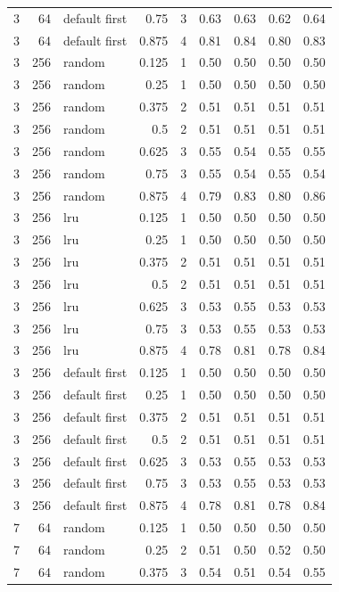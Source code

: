 \begin{longtable}{@{}rrlrrrrrr@{}}
3 & 64 & default first & 0.75 & 3 & 0.63 & 0.63 & 0.62 & 0.64 \\
3 & 64 & default first & 0.875 & 4 & 0.81 & 0.84 & 0.80 & 0.83 \\
3 & 256 & random & 0.125 & 1 & 0.50 & 0.50 & 0.50 & 0.50 \\
3 & 256 & random & 0.25 & 1 & 0.50 & 0.50 & 0.50 & 0.50 \\
3 & 256 & random & 0.375 & 2 & 0.51 & 0.51 & 0.51 & 0.51 \\
3 & 256 & random & 0.5 & 2 & 0.51 & 0.51 & 0.51 & 0.51 \\
3 & 256 & random & 0.625 & 3 & 0.55 & 0.54 & 0.55 & 0.55 \\
3 & 256 & random & 0.75 & 3 & 0.55 & 0.54 & 0.55 & 0.54 \\
3 & 256 & random & 0.875 & 4 & 0.79 & 0.83 & 0.80 & 0.86 \\
3 & 256 & lru & 0.125 & 1 & 0.50 & 0.50 & 0.50 & 0.50 \\
3 & 256 & lru & 0.25 & 1 & 0.50 & 0.50 & 0.50 & 0.50 \\
3 & 256 & lru & 0.375 & 2 & 0.51 & 0.51 & 0.51 & 0.51 \\
3 & 256 & lru & 0.5 & 2 & 0.51 & 0.51 & 0.51 & 0.51 \\
3 & 256 & lru & 0.625 & 3 & 0.53 & 0.55 & 0.53 & 0.53 \\
3 & 256 & lru & 0.75 & 3 & 0.53 & 0.55 & 0.53 & 0.53 \\
3 & 256 & lru & 0.875 & 4 & 0.78 & 0.81 & 0.78 & 0.84 \\
3 & 256 & default first & 0.125 & 1 & 0.50 & 0.50 & 0.50 & 0.50 \\
3 & 256 & default first & 0.25 & 1 & 0.50 & 0.50 & 0.50 & 0.50 \\
3 & 256 & default first & 0.375 & 2 & 0.51 & 0.51 & 0.51 & 0.51 \\
3 & 256 & default first & 0.5 & 2 & 0.51 & 0.51 & 0.51 & 0.51 \\
3 & 256 & default first & 0.625 & 3 & 0.53 & 0.55 & 0.53 & 0.53 \\
3 & 256 & default first & 0.75 & 3 & 0.53 & 0.55 & 0.53 & 0.53 \\
3 & 256 & default first & 0.875 & 4 & 0.78 & 0.81 & 0.78 & 0.84 \\
7 & 64 & random & 0.125 & 1 & 0.50 & 0.50 & 0.50 & 0.50 \\
7 & 64 & random & 0.25 & 2 & 0.51 & 0.50 & 0.52 & 0.50 \\
7 & 64 & random & 0.375 & 3 & 0.54 & 0.51 & 0.54 & 0.55 \\

\end{longtable}
